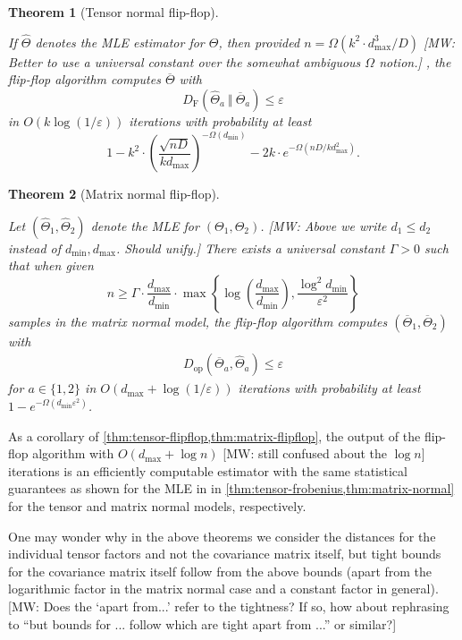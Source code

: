\documentclass[aos]{imsart}
\newtheorem{theorem}{Theorem}[section]
\theoremstyle{definition}
\numberwithin{equation}{section}
\newcommand{\otheta}{\overline{\Theta}}
\newcommand{\htheta}{\widehat{\Theta}}
\newcommand{\eps}{\varepsilon}
\newcommand{\DF}{D_{\operatorname{F}}}
\newcommand{\Dop}{D_{\operatorname{op}}}
\def\dmin{d_{\min}}
\def\dmax{d_{\max}}
\newcommand{\MW}[1]{{\color{red}[MW: #1]}}
\newcommand{\MW}[1]{{}}
\begin{document}
\newcommand{\TensorFlop}{
	If $\htheta$ denotes the MLE estimator for $\Theta$, then provided $n = \Omega(k^2 \cdot \dmax^3/D)$ \MW{Better to use a universal constant over the somewhat ambiguous $\Omega$ notion.} , the flip-flop algorithm computes $\otheta$ with
	$$ \DF(\htheta_a \ \Vert  \ \otheta_a) \leq \eps $$
	in $O(k \log(1/\eps))$ iterations with probability at least
	$$ 1 - k^2 \cdot \left( \dfrac{\sqrt{nD}}{k \dmax} \right)^{-\Omega(\dmin)} - 2k \cdot e^{- \Omega(nD/k \dmax^2)}.$$}

\begin{theorem}[Tensor normal flip-flop]\label{thm:tensor-flipflop}
\TensorFlop
\end{theorem}

\newcommand{\MatrixFlop}{
Let $(\widehat{\Theta}_1,\widehat{\Theta}_2)$ denote the MLE for $(\Theta_1,\Theta_2)$.
\MW{Above we write $d_1 \leq d_2$ instead of $\dmin,\dmax$. Should unify.}
There exists a universal constant $\Gamma > 0$ such that when given
$$n \geq \Gamma \cdot \dfrac{\dmax}{\dmin} \cdot \max\left\{ \log\left( \dfrac{\dmax}{\dmin} \right), \dfrac{\log^2 \dmin}{\varepsilon^2} \right\}$$
samples in the matrix normal model, the flip-flop algorithm computes $(\overline{\Theta}_1,\overline{\Theta}_2)$ with
\begin{align*}
  \Dop(\overline{\Theta}_a, \widehat{\Theta}_a) \leq \eps
\end{align*}
for $a\in\{1,2\}$ in $O\left(\dmax +  \log(1/\varepsilon) \right)$ iterations with probability at least $1 - e^{- \Omega(\dmin \varepsilon^2)}$.
}

\begin{theorem}[Matrix normal flip-flop]\label{thm:matrix-flipflop}
\MatrixFlop\end{theorem}
As a corollary of \cref{thm:tensor-flipflop,thm:matrix-flipflop}, the output of the flip-flop algorithm with $O\left(\dmax +  \log n \right)$ \MW{still confused about the $\log n$} iterations is an efficiently computable estimator with the same statistical guarantees as shown for the MLE in in \cref{thm:tensor-frobenius,thm:matrix-normal} for the tensor and matrix normal models, respectively.

One may wonder why in the above theorems we consider the distances for the individual tensor factors and not the covariance matrix itself, but tight bounds for the covariance matrix itself follow from the above bounds (apart from the logarithmic factor in the matrix normal case and a constant factor in general).
\MW{Does the `apart from...' refer to the tightness? If so, how about rephrasing to ``but bounds for ... follow which are tight apart from ...'' or similar?}
\end{document}
